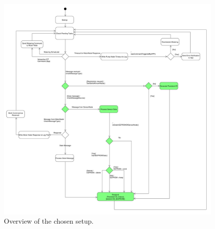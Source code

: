 \documentclass[12pt,a4paper,titlepage,oneside]{article}
\begin{document}
\begin{figure}[h!]
	\begin{center}
	\includegraphics[scale=0.24]{../ControlNode_Diagramm.pdf}
	\caption{Overview of the chosen setup.}
	\label{Setup_overview}
	\end{center}
\end{figure}
\end{document}
